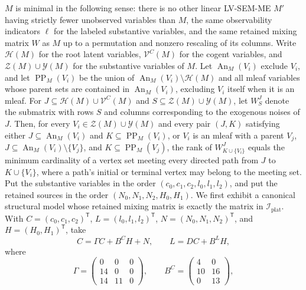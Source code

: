 \(M\) is minimal in the following sense: there is no other linear LV-SEM-ME \(M'\) having strictly fewer unobserved variables than \(M\), the same observability indicators \(\ell\) for the labeled substantive variables, and the same retained mixing matrix \(W\) as \(M\) up to a permutation and nonzero rescaling of its columns.
Write \(\mathcal H(M)\) for the root latent variables, \(\mathcal V^{C}(M)\) for the cogent variables, and \(\mathcal Z(M)\cup\mathcal Y(M)\) for the substantive variables of \(M\).  Let \(\operatorname{An}_{M}(V_i)\) exclude \(V_i\), and let \(\operatorname{PP}_{M}(V_i)\) be the union of \(\operatorname{An}_{M}(V_i)\setminus\mathcal H(M)\) and all mleaf variables whose parent sets are contained in \(\operatorname{An}_{M}(V_i)\), excluding \(V_i\) itself when it is an mleaf.  For \(J\subseteq\mathcal H(M)\cup\mathcal V^{C}(M)\) and \(S\subseteq\mathcal Z(M)\cup\mathcal Y(M)\), let \(W^{J}_{S}\) denote the submatrix with rows \(S\) and columns corresponding to the exogenous noises of \(J\).  Then, for every \(V_i\in\mathcal Z(M)\cup\mathcal Y(M)\) and every pair \((J,K)\) satisfying either \(J\subseteq\operatorname{An}_{M}(V_i)\) and \(K\subseteq\operatorname{PP}_{M}(V_i)\), or \(V_i\) is an mleaf with a parent \(V_j\), \(J\subseteq\operatorname{An}_{M}(V_i)\setminus\{V_j\}\), and \(K\subseteq\operatorname{PP}_{M}(V_j)\), the rank of \(W^{J}_{K\cup\{V_i\}}\) equals the minimum cardinality of a vertex set meeting every directed path from \(J\) to \(K\cup\{V_i\}\), where a path's initial or terminal vertex may belong to the meeting set.
Put the substantive variables in the order \((c_0,c_1,c_2,l_0,l_1,l_2)\), and put the retained sources in the order \((N_0,N_1,N_2,H_0,H_1)\).  We first exhibit a canonical structural model whose retained mixing matrix is exactly the matrix in \(\mathcal I_{\mathrm{plat}}\).  With \(C=(c_0,c_1,c_2)^{\mathsf T}\), \(L=(l_0,l_1,l_2)^{\mathsf T}\), \(N=(N_0,N_1,N_2)^{\mathsf T}\), and \(H=(H_0,H_1)^{\mathsf T}\), take
\[
C=\Gamma C+B^{C}H+N,\qquad L=DC+B^{L}H,
\]
where
\[
\Gamma=
\begin{pmatrix}
0&0&0\\
14&0&0\\
14&11&0
\end{pmatrix},\qquad
B^{C}=
\begin{pmatrix}
4&0\\
10&16\\
0&13
\end{pmatrix},
\]

